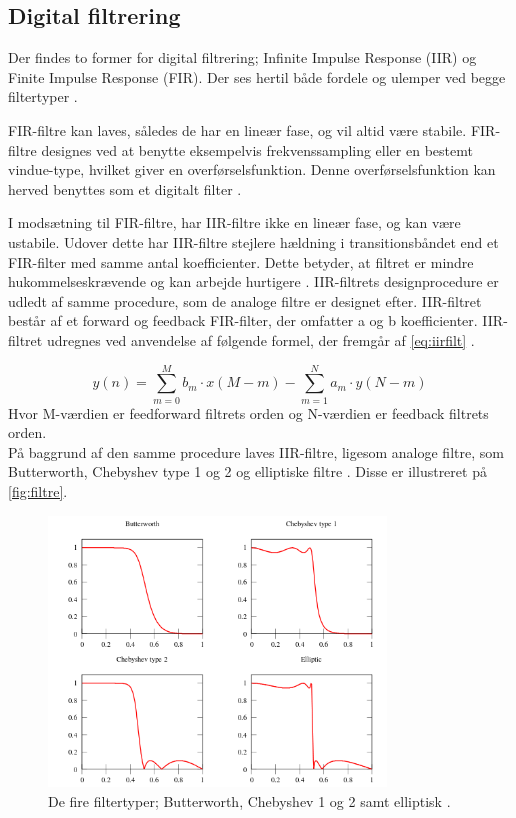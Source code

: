 \subsection{Digital filtrering} \label{sec:teori_filter}
Der findes to former for digital filtrering; Infinite Impulse Response (IIR) og Finite Impulse Response (FIR). Der ses hertil både fordele og ulemper ved begge filtertyper \citep{blandford2012}.

FIR-filtre kan laves, således de har en lineær fase, og vil altid være stabile. 
FIR-filtre designes ved at benytte eksempelvis frekvenssampling eller en bestemt vindue-type, hvilket giver en overførselsfunktion. 
Denne overførselsfunktion kan herved benyttes som et digitalt filter \citep{blandford2012}. 

I modsætning til FIR-filtre, har IIR-filtre ikke en lineær fase, og kan være ustabile. 
Udover dette har IIR-filtre stejlere hældning i transitionsbåndet end et FIR-filter med samme antal koefficienter. 
Dette betyder, at filtret er mindre hukommelseskrævende og kan arbejde hurtigere \citep{blandford2012}. 
IIR-filtrets designprocedure er udledt af samme procedure, som de analoge filtre er designet efter.
IIR-filtret består af et forward og feedback FIR-filter, der omfatter a og b koefficienter. 
IIR-filtret udregnes ved anvendelse af følgende formel, der fremgår af \autoref{eq:iirfilt} \citep{francis2009}. 

\begin{equation} \label{eq:iirfilt}
	y(n)= \sum_{m=0}^{M} b_{m} \cdot x(M-m)- \sum^{N}_{m=1} a_{m} \cdot y(N-m)
\end{equation}
\noindent
Hvor M-værdien er feedforward filtrets orden og N-værdien er feedback filtrets orden. \\


\noindent
På baggrund af den samme procedure laves IIR-filtre, ligesom analoge filtre, som Butterworth, Chebyshev type 1 og 2 og elliptiske filtre \citep{blandford2012}. Disse er illustreret på \autoref{fig:filtre}.

\begin{figure}[H]
\centering
\includegraphics[width=0.8\textwidth]{figures/filtre}
\caption{De fire filtertyper; Butterworth, Chebyshev 1 og 2 samt elliptisk \citep{wikipedia2016}.}
\label{fig:filtre}
\end{figure}


